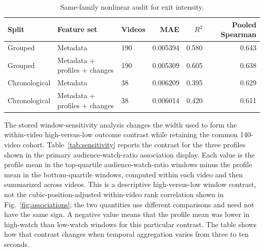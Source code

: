 \begin{table}[!t]
\caption{Same-family nonlinear audit for exit intensity.}
\label{tab:nonlinear}
\centering
\renewcommand{\arraystretch}{1.1}
\tablebodyfont
\begin{tabular}{@{}lllrrr@{}}
\toprule
Split & Feature set & Videos & MAE & $R^2$ & Pooled Spearman \\
\midrule
Grouped & Metadata & 190 & 0.005394 & 0.580 & 0.643 \\
Grouped & Metadata + profiles + changes & 190 & 0.005309 & 0.605 & 0.638 \\
Chronological & Metadata & 38 & 0.006209 & 0.395 & 0.629 \\
Chronological & Metadata + profiles + changes & 38 & 0.006014 & 0.420 & 0.611 \\
\bottomrule
\end{tabular}
\end{table}

The stored window-sensitivity analysis changes the width used to form the
within-video high-versus-low outcome contrast while retaining the common
140-video cohort. Table~\ref{tab:sensitivity} reports the contrast for the
three profiles shown in the primary audience-watch-ratio association display.
Each value is the profile mean in the top-quartile audience-watch-ratio
windows minus the profile mean in the bottom-quartile windows, computed within
each video and then summarized across videos. This is a descriptive
high-versus-low window contrast, not the cubic-position-adjusted within-video
rank correlation shown in Fig.~\ref{fig:associations}; the two quantities use
different comparisons and need not have the same sign.  A negative value means
that the profile mean was lower in high-watch than low-watch windows for this
particular contrast. The table shows how that contrast changes when temporal
aggregation varies from three to ten seconds.

